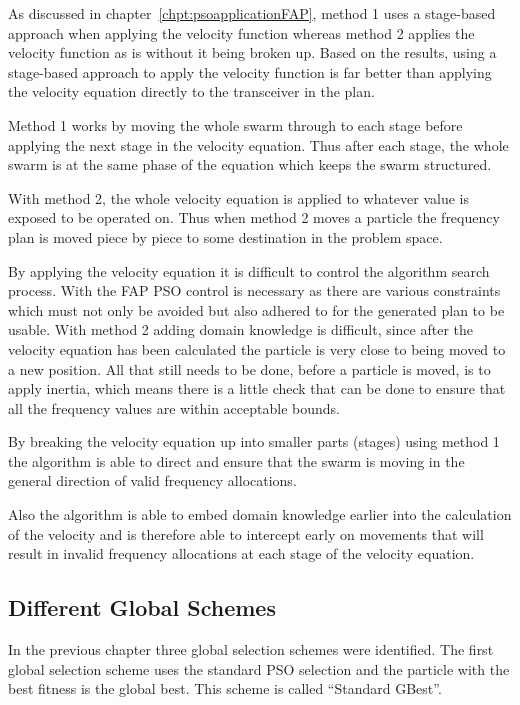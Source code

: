 As discussed in chapter~\ref{chpt:psoapplicationFAP}, method 1 uses a stage-based approach when applying the velocity function whereas method 2 applies the velocity function as is without it being broken up. Based on the results, using a stage-based approach to apply the velocity function is far better than applying the velocity equation directly to the transceiver in the plan.

Method 1 works by moving the whole swarm through to each stage before applying the next stage in the velocity equation. Thus after each stage, the whole swarm is at the same phase of the equation which keeps the swarm structured.

With method 2, the whole velocity equation is applied to whatever value is exposed to be operated on. Thus when method 2 moves a particle the frequency plan is moved piece by piece to some destination in the problem space.

By applying the velocity equation it is difficult to control the algorithm search process. With the FAP PSO control is necessary as there are various constraints which must not only be avoided but also adhered to for the generated plan to be usable. With method 2 adding domain knowledge is difficult, since after the velocity equation has been calculated the particle is very close to being moved to a new position. All that still needs to be done, before a particle is moved, is to apply inertia, which means there is a little check that can be done to ensure that all the frequency values are within acceptable bounds.

By breaking the velocity equation up into smaller parts (stages) using method 1 the algorithm is able to direct and ensure that the swarm is moving in the general direction of valid frequency allocations.

Also the algorithm is able to embed domain knowledge earlier into the calculation of the velocity and is therefore able to intercept early on movements that will result in invalid frequency allocations at each stage of the velocity equation.

\subsection{Different Global Schemes}
\label{sec:diffglobalschemes}
In the previous chapter three global selection schemes were identified. The first global selection scheme uses the standard PSO selection and the particle with the best fitness is the global best. This scheme is called ``Standard GBest''.

